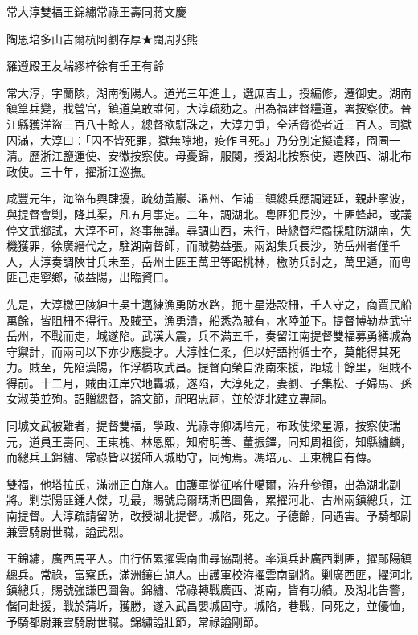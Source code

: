 
\begin{pinyinscope}
常大淳雙福王錦繡常祿王壽同蔣文慶

陶恩培多山吉爾杭阿劉存厚★闊周兆熊

羅遵殿王友端繆梓徐有壬王有齡

常大淳，字蘭陔，湖南衡陽人。道光三年進士，選庶吉士，授編修，遷御史。湖南鎮筸兵變，戕營官，鎮道莫敢誰何，大淳疏劾之。出為福建督糧道，署按察使。晉江縣獲洋盜三百八十餘人，總督欲駢誅之，大淳力爭，全活脅從者近三百人。司獄囚滿，大淳曰：「囚不皆死罪，獄無隙地，疫作且死。」乃分別定擬遣釋，囹圄一清。歷浙江鹽運使、安徽按察使。母憂歸，服闋，授湖北按察使，遷陜西、湖北布政使。三十年，擢浙江巡撫。

咸豐元年，海盜布興肆擾，疏劾黃巖、溫州、乍浦三鎮總兵應調遲延，親赴寧波，與提督會剿，降其渠，凡五月事定。二年，調湖北。粵匪犯長沙，土匪蜂起，或議停文武鄉試，大淳不可，終事無譁。尋調山西，未行，時總督程矞採駐防湖南，失機獲罪，徐廣縉代之，駐湖南督師，而賊勢益張。兩湖集兵長沙，防岳州者僅千人，大淳奏調陜甘兵未至，岳州土匪王萬里等踞桃林，檄防兵討之，萬里遁，而粵匪己走寧鄉，破益陽，出臨資口。

先是，大淳檄巴陵紳士吳士邁練漁勇防水路，扼土星港設柵，千人守之，商賈民船萬餘，皆阻柵不得行。及賊至，漁勇潰，船悉為賊有，水陸並下。提督博勒恭武守岳州，不戰而走，城遂陷。武漢大震，兵不滿五千，奏留江南提督雙福募勇繕城為守禦計，而兩司以下亦少應變才。大淳性仁柔，但以好語拊循士卒，莫能得其死力。賊至，先陷漢陽，作浮橋攻武昌。提督向榮自湖南來援，距城十餘里，阻賊不得前。十二月，賊由江岸穴地轟城，遂陷，大淳死之，妻劉、子集松、子婦馬、孫女淑英並殉。詔贈總督，謚文節，祀昭忠祠，並於湖北建立專祠。

同城文武被難者，提督雙福，學政、光祿寺卿馮培元，布政使梁星源，按察使瑞元，道員王壽同、王東槐、林恩熙，知府明善、董振鐸，同知周祖銜，知縣繡麟，而總兵王錦繡、常祿皆以援師入城助守，同殉焉。馮培元、王東槐自有傳。

雙福，他塔拉氏，滿洲正白旗人。由護軍從征喀什噶爾，洊升參領，出為湖北副將。剿崇陽匪鍾人傑，功最，賜號烏爾瑪斯巴圖魯，累擢河北、古州兩鎮總兵，江南提督。大淳疏請留防，改授湖北提督。城陷，死之。子德齡，同遇害。予騎都尉兼雲騎尉世職，謚武烈。

王錦繡，廣西馬平人。由行伍累擢雲南曲尋協副將。率滇兵赴廣西剿匪，擢鄖陽鎮總兵。常祿，富察氏，滿洲鑲白旗人。由護軍校洊擢雲南副將。剿廣西匪，擢河北鎮總兵，賜號強謙巴圖魯。錦繡、常祿轉戰廣西、湖南，皆有功績。及湖北告警，偕同赴援，戰於蒲圻，獲勝，遂入武昌嬰城固守。城陷，巷戰，同死之，並優恤，予騎都尉兼雲騎尉世職。錦繡謚壯節，常祿謚剛節。


\end{pinyinscope}
